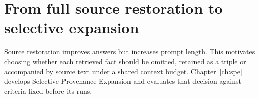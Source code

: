 \section{From full source restoration to selective expansion}
\label{sec:ch6_to_spe}

Source restoration improves answers but increases prompt length. This motivates choosing
whether each retrieved fact should be omitted, retained as a triple or accompanied by
source text under a shared context budget. Chapter~\ref{ch:spe} develops Selective
Provenance Expansion and evaluates that decision against criteria fixed before its runs.
